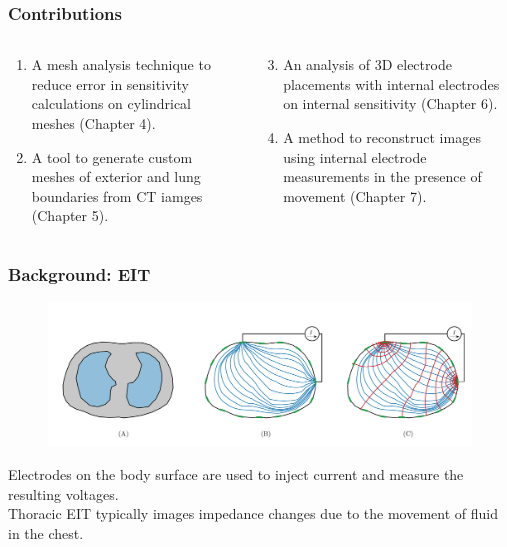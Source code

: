\documentclass[10pt,    %
    english,            %
    xcolor=table,       %
    envcountsect,        %
    aspectratio=1610
]{beamer}
\begin{document}
\begin{frame}
	\frametitle{Contributions}    
	\begin{columns}[c]
		\begin{column}{0.5\textwidth}
			\begin{enumerate}
				\item A mesh analysis technique to reduce error in sensitivity calculations on 
				cylindrical meshes (\alert{Chapter 4}). \\ \vspace{4mm}
				\item A tool to generate custom meshes of exterior and lung boundaries from CT iamges
				(\alert{Chapter 5}).
			\end{enumerate}
		\end{column}
		\begin{column}{0.5\textwidth}
			\begin{enumerate}
				\setcounter{enumi}{2}
				\item An analysis of 3D electrode placements with internal electrodes on internal 
				sensitivity (\alert{Chapter 6}). \\ \vspace{4mm}
				\item A method to reconstruct images using internal electrode measurements in the
				presence of movement (\alert{Chapter 7}).
			\end{enumerate}
		\end{column}
	\end{columns}
\end{frame}

\begin{frame}
	\frametitle{Background: EIT}
	\begin{figure}
		\centering
	\includegraphics[width=\textwidth,trim={0 2cm 0 0},clip]{imgs/current_and_equipotential_lines.pdf}
	\end{figure}
	\vspace{2mm}
	Electrodes on the body surface are used to inject current and measure the resulting voltages. \\
	\vspace{0.5cm}
	Thoracic EIT typically images impedance changes due to the movement of fluid in the chest. \\
\end{frame}
\end{document}
